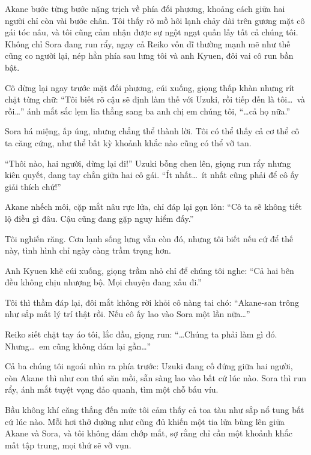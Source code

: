 \documentclass[../main.tex]{subfiles}
\begin{document}
Akane bước từng bước nặng trịch về phía đối phương, khoảng cách giữa hai người chỉ còn vài bước chân. Tôi thấy rõ mồ hôi lạnh chảy dài trên gương mặt cô gái tóc nâu, và tôi cũng cảm nhận được sự ngột ngạt quấn lấy tất cả chúng tôi. Không chỉ Sora đang run rẩy, ngay cả Reiko vốn dĩ thường mạnh mẽ như thế cũng co người lại, nép hẳn phía sau lưng tôi và anh Kyuen, đôi vai cô run bần bật.

Cô dừng lại ngay trước mặt đối phương, cúi xuống, giọng thấp khàn nhưng rít chặt từng chữ: ``Tôi biết rõ cậu sẽ định làm thế với Uzuki, rồi tiếp đến là tôi\dots\ và rồi\dots'' ánh mắt sắc lẹm lia thẳng sang ba anh chị em chúng tôi, ``\dots cả họ nữa.''

Sora há miệng, ấp úng, nhưng chẳng thể thành lời. Tôi có thể thấy cả cơ thể cô ta căng cứng, như thể bất kỳ khoảnh khắc nào cũng có thể vỡ tan.

``Thôi nào, hai người, dừng lại đi!'' Uzuki bỗng chen lên, giọng run rẩy nhưng kiên quyết, dang tay chắn giữa hai cô gái. ``Ít nhất\dots\ ít nhất cũng phải để cô ấy giải thích chứ!''


Akane nhếch môi, cặp mắt nâu rực lửa, chỉ đáp lại gọn lỏn: ``Cô ta sẽ không tiết lộ điều gì đâu. Cậu cũng đang gặp nguy hiểm đấy.''

Tôi nghiến răng. Cơn lạnh sống lưng vẫn còn đó, nhưng tôi biết nếu cứ để thế này, tình hình chỉ ngày càng trầm trọng hơn.

Anh Kyuen khẽ cúi xuống, giọng trầm nhỏ chỉ để chúng tôi nghe: ``Cả hai bên đều không chịu nhượng bộ. Mọi chuyện đang xấu đi.''

Tôi thì thầm đáp lại, đôi mắt không rời khỏi cô nàng tai chó: ``Akane-san trông như sắp mất lý trí thật rồi. Nếu cô ấy lao vào Sora một lần nữa\dots''

Reiko siết chặt tay áo tôi, lắc đầu, giọng run: ``\dots Chúng ta phải làm gì đó. Nhưng\dots\ em cũng không dám lại gần\dots''

Cả ba chúng tôi ngoái nhìn ra phía trước: Uzuki đang cố đứng giữa hai người, còn Akane thì như con thú săn mồi, sẵn sàng lao vào bất cứ lúc nào. Sora thì run rẩy, ánh mắt tuyệt vọng đảo quanh, tìm một chỗ bấu víu.

Bầu không khí căng thẳng đến mức tôi cảm thấy cả toa tàu như sắp nổ tung bất cứ lúc nào. Mỗi hơi thở dường như cũng đủ khiến một tia lửa bùng lên giữa Akane và Sora, và tôi không dám chớp mắt, sợ rằng chỉ cần một khoảnh khắc mất tập trung, mọi thứ sẽ vỡ vụn.
\end{document}
